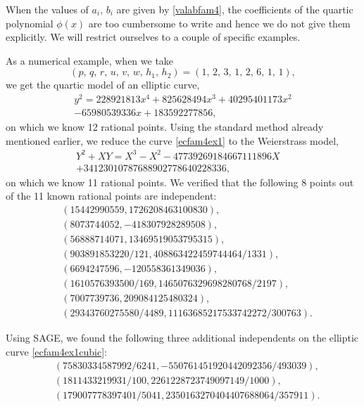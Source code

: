 \documentclass[11pt, leqno]{article}
\begin{document}
When the values of $a_i, \,b_i$ are given by \eqref{valabfam4}, the coefficients of the quartic polynomial $\phi(x)$ are too cumbersome to write and hence we do not give them explicitly. We will restrict ourselves to a couple of specific examples.

As a numerical example, when we take \[(p,\,q,\,r,\,u,\,v,\,w,\,h_1,\,h_2)=(1,\, 2,\,   3 ,\,  1 ,\,  2,\,   6 ,\,  1,\,   1),\]  we get the  quartic model of an elliptic curve,
\begin{multline}
y^2=228921813x^4+825628494x^3+40295401173x^2\\
-65980539336x+183592277856,\quad \quad \quad \quad \quad \quad \label{ecfam4ex1}
\end{multline}
on which we know 12 rational points. Using the standard method already mentioned earlier, we reduce the curve \eqref{ecfam4ex1} to the  Weierstrass model,
\begin{multline}
Y^2+XY=X^3-X^2-47739269184667111896X\\
+34123010787688902778640228336, \quad \quad \quad \quad \quad \quad \label{ecfam4ex1cubic}
\end{multline}
on which we know  11  rational points. We verified that the following 8 points out of the 11 known rational points are independent:
\begin{equation}
\begin{aligned}
&(15442990559, 1726208463100830),\\
&(8073744052, -418307928289508),\\
&(56888714071, 13469519053795315),\\
&(903891853220/121, 408863422459744464/1331),\\
&(6694247596, -120558361349036),\\
&(1610576393500/169, 1465076329698280768/2197),\\
&(7007739736, 209084125480324),\\
&(29343760275580/4489, 11163685217533742272/300763).
\end{aligned} \label{pointsecfam4ex1a}
\end{equation}

Using SAGE, we found the following three additional independents on the  elliptic curve \eqref{ecfam4ex1cubic}:
\begin{equation}
\begin{aligned}
&(75830334587992/6241, -550761451920442092356/493039),\\
&(1811433219931/100, 2261228723749097149/1000),\\
&(179007778397401/5041, 2350163270404407688064/357911).
\end{aligned} \label{pointsecfam4ex1b}
\end{equation}
\end{document}
